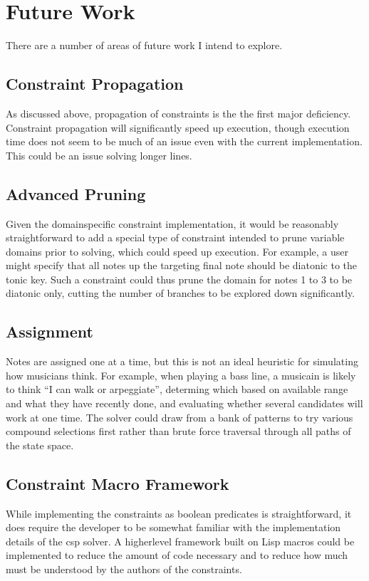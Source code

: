 \documentclass[letterpaper,10pt,english]{sphinxmanual}
\begin{document}
\chapter{Future Work}
\label{\detokenize{index:future-work}}
\sphinxAtStartPar
There are a number of areas of future work I intend to explore.


\section{Constraint Propagation}
\label{\detokenize{index:constraint-propagation}}
\sphinxAtStartPar
As discussed above, propagation of constraints is the the first major deficiency.
Constraint propagation will significantly speed up execution, though execution time
does not seem to be much of an issue even with the current implementation. This
could be an issue solving longer lines.


\section{Advanced Pruning}
\label{\detokenize{index:advanced-pruning}}
\sphinxAtStartPar
Given the domain\sphinxhyphen{}specific constraint implementation, it would be reasonably straight\sphinxhyphen{}forward
to add a special type of constraint intended to prune variable domains prior to solving,
which could speed up execution. For example, a user might specify that all notes up the
targeting final note should be diatonic to the tonic key. Such a constraint could
thus prune the domain for notes 1 to 3 to be diatonic only, cutting the number of
branches to be explored down significantly.


\section{Assignment}
\label{\detokenize{index:assignment}}
\sphinxAtStartPar
Notes are assigned one at a time, but this is not an ideal heuristic for simulating
how musicians think. For example, when playing a bass line, a musicain is likely
to think “I can walk or arpeggiate”, determing which based on available range
and what they have recently done, and evaluating whether several candidates will work
at one time. The solver could draw from a bank of patterns to try various compound
selections first rather than brute force traversal through all paths of the state space.


\section{Constraint Macro Framework}
\label{\detokenize{index:constraint-macro-framework}}
\sphinxAtStartPar
While implementing the constraints as boolean predicates is straightforward, it does
require the developer to be somewhat familiar with the implementation details of
the csp solver. A higher\sphinxhyphen{}level framework built on Lisp macros could be implemented
to reduce the amount of code necessary and to reduce how much must be understood
by the authors of the constraints.
\end{document}
